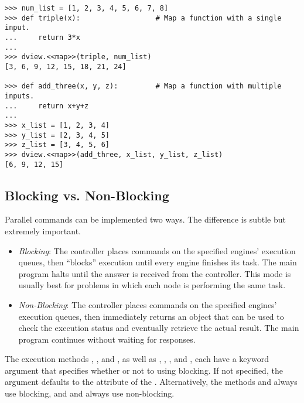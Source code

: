 \begin{lstlisting}
>>> num_list = [1, 2, 3, 4, 5, 6, 7, 8]
>>> def triple(x):                  # Map a function with a single input.
...     return 3*x
...
>>> dview.<<map>>(triple, num_list)
[3, 6, 9, 12, 15, 18, 21, 24]

>>> def add_three(x, y, z):         # Map a function with multiple inputs.
...     return x+y+z
...
>>> x_list = [1, 2, 3, 4]
>>> y_list = [2, 3, 4, 5]
>>> z_list = [3, 4, 5, 6]
>>> dview.<<map>>(add_three, x_list, y_list, z_list)
[6, 9, 12, 15]
\end{lstlisting}


\subsection*{Blocking vs. Non-Blocking} %

Parallel commands can be implemented two ways.
The difference is subtle but extremely important.

\begin{itemize}
\item \emph{Blocking}: The controller places commands on the specified engines' execution queues, then ``blocks'' execution until every engine finishes its task.
The main program halts until the answer is received from the controller.
This mode is usually best for problems in which each node is performing the same task.
\item \emph{Non-Blocking}: The controller places commands on the specified engines' execution queues, then immediately returns an  object that can be used to check the execution status and eventually retrieve the actual result.
The main program continues without waiting for responses.
\end{itemize}

The execution methods , , and , as well as , , , and , each have a keyword argument  that specifies whether or not to using blocking.
If not specified, the argument defaults to the  attribute of the .
Alternatively, the methods  and  always use blocking, and  and  always use non-blocking.


